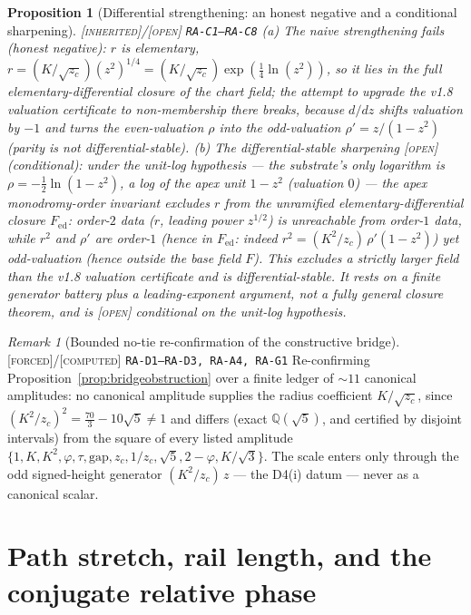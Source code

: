 \documentclass[11pt]{article}
\newcommand{\tagF}{\textcolor{cF}{\textsc{[forced]}}}
\newcommand{\tagC}{\textcolor{cC}{\textsc{[computed]}}}
\newcommand{\tagI}{\textcolor{cI}{\textsc{[inherited]}}}
\newcommand{\tagO}{\textcolor{cO}{\textsc{[open]}}}
\newcommand{\hx}[1]{\textcolor{cC}{\footnotesize\texttt{#1}}}
\newcommand{\Q}{\mathbb{Q}}
\newcommand{\gp}{\varphi}
\newcommand{\gapc}{\mathrm{gap}}
\theoremstyle{plain}
\newtheorem{proposition}[theorem]{Proposition}
\theoremstyle{definition}
\theoremstyle{remark}
\newtheorem{remark}[theorem]{Remark}
\begin{document}
\begin{proposition}[Differential strengthening: an honest negative and a conditional sharpening]\label{prop:radiff}\tagI{}/\tagO{} \hx{RA-C1--RA-C8}
\emph{(a) The naive strengthening fails} (honest negative): $r$ \emph{is}
elementary, $r=(K/\sqrt{z_c})(z^2)^{1/4}=(K/\sqrt{z_c})\exp(\tfrac14\ln(z^2))$, so
it lies in the full elementary-differential closure of the chart field; the
attempt to upgrade the v1.8 valuation certificate to non-membership \emph{there}
breaks, because $d/dz$ shifts valuation by $-1$ and turns the even-valuation
$\rho$ into the odd-valuation $\rho'=z/(1-z^2)$ (parity is not
differential-stable). \emph{(b) The differential-stable sharpening}
\tagO{}\emph{ (conditional)}: under the \emph{unit-log hypothesis} --- the
substrate's only logarithm is $\rho=-\tfrac12\ln(1-z^2)$, a log of the apex
\emph{unit} $1-z^2$ (valuation $0$) --- the apex \emph{monodromy-order} invariant
excludes $r$ from the \emph{unramified} elementary-differential closure
$F_{\mathrm{ed}}$: order-$2$ data ($r$, leading power $z^{1/2}$) is unreachable
from order-$1$ data, while $r^2$ and $\rho'$ are order-$1$ (hence \emph{in}
$F_{\mathrm{ed}}$: indeed $r^2=(K^2/z_c)\,\rho'(1-z^2)$) yet odd-valuation (hence
\emph{outside} the base field $F$). This excludes a \emph{strictly larger} field
than the v1.8 valuation certificate and is differential-stable. It rests on a
finite generator battery plus a leading-exponent argument, not a fully general
closure theorem, and is \tagO{} conditional on the unit-log hypothesis.
\end{proposition}

\begin{remark}[Bounded no-tie re-confirmation of the constructive bridge]\label{rem:ratie}\tagF{}/\tagC{} \hx{RA-D1--RA-D3, RA-A4, RA-G1}
Re-confirming Proposition~\ref{prop:bridgeobstruction} over a finite ledger of
$\sim11$ canonical amplitudes: no canonical amplitude supplies the radius
coefficient $K/\sqrt{z_c}$, since $(K^2/z_c)^2=\tfrac{70}3-10\sqrt5\neq1$ and
differs (exact $\Q(\sqrt5)$, and certified by disjoint intervals) from the square
of every listed amplitude $\{1,K,K^2,\gp,\tau,\gapc,z_c,1/z_c,\sqrt5,2-\gp,
K/\sqrt3\}$. The scale enters only through the odd signed-height generator
$(K^2/z_c)\,z$ --- the D4(i) datum --- never as a canonical scalar.
\end{remark}


\section{Path stretch, rail length, and the conjugate relative phase}\label{sec:pathstretch}
\end{document}
